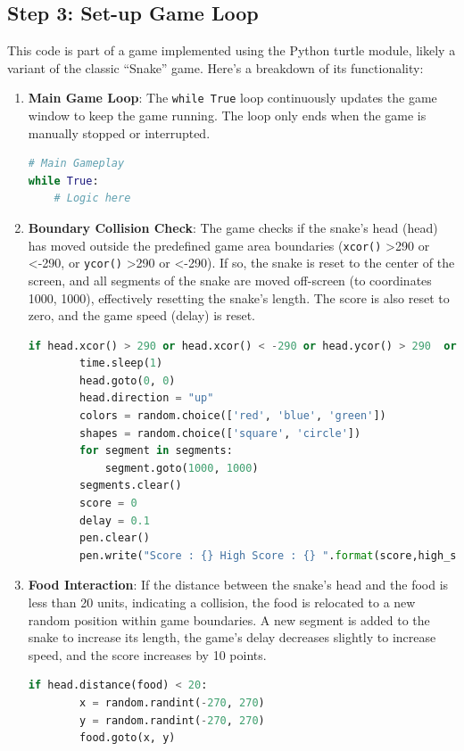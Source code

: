 \subsection{Step 3: Set-up Game Loop}

This code is part of a game implemented using the Python turtle module, likely a variant of the classic “Snake” game. Here’s a breakdown of its functionality:

\begin{enumerate}
  \item \textbf{Main Game Loop}: The \texttt{while True} loop continuously updates the game window to keep the game running. The loop only ends when the game is manually stopped or interrupted.
\begin{lstlisting}[language=Python]
# Main Gameplay
while True:
    # Logic here
\end{lstlisting}

\clearpage
\item \textbf{Boundary Collision Check}: The game checks if the snake’s head (head) has moved outside the predefined game area boundaries (\texttt{xcor()} \textgreater 290 or \textless -290, or \texttt{ycor()} \textgreater 290 or \textless -290). If so, the snake is reset to the center of the screen, and all segments of the snake are moved off-screen (to coordinates 1000, 1000), effectively resetting the snake’s length. The score is also reset to zero, and the game speed (delay) is reset.
\begin{lstlisting}[language=Python]
    if head.xcor() > 290 or head.xcor() < -290 or head.ycor() > 290  or head.ycor() < -290:
        time.sleep(1)
        head.goto(0, 0)
        head.direction = "up"
        colors = random.choice(['red', 'blue', 'green'])
        shapes = random.choice(['square', 'circle'])
        for segment in segments:
            segment.goto(1000, 1000)
        segments.clear()
        score = 0
        delay = 0.1
        pen.clear()
        pen.write("Score : {} High Score : {} ".format(score,high_score), align="center", font=("candara", 24, "bold"))
\end{lstlisting}

\item \textbf{Food Interaction}: If the distance between the snake’s head and the food is less than 20 units, indicating a collision, the food is relocated to a new random position within game boundaries. A new segment is added to the snake to increase its length, the game’s delay decreases slightly to increase speed, and the score increases by 10 points.
\begin{lstlisting}[language=Python]
    if head.distance(food) < 20:
        x = random.randint(-270, 270)
        y = random.randint(-270, 270)
        food.goto(x, y)


\end{lstlisting}
\end{enumerate}
